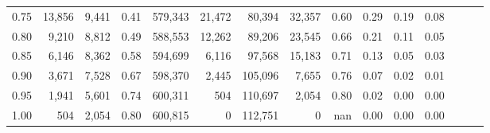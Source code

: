 \begin{tabular}{rrrrrrrrrrrrrrr}
0.75 &  13,856 &   9,441 &  0.41 &  579,343 &   21,472 &   80,394 &   32,357 &  0.60 &  0.29 &  0.19 &      0.08 \\
0.80 &   9,210 &   8,812 &  0.49 &  588,553 &   12,262 &   89,206 &   23,545 &  0.66 &  0.21 &  0.11 &      0.05 \\
0.85 &   6,146 &   8,362 &  0.58 &  594,699 &    6,116 &   97,568 &   15,183 &  0.71 &  0.13 &  0.05 &      0.03 \\
0.90 &   3,671 &   7,528 &  0.67 &  598,370 &    2,445 &  105,096 &    7,655 &  0.76 &  0.07 &  0.02 &      0.01 \\
0.95 &   1,941 &   5,601 &  0.74 &  600,311 &      504 &  110,697 &    2,054 &  0.80 &  0.02 &  0.00 &      0.00 \\
1.00 &     504 &   2,054 &  0.80 &  600,815 &        0 &  112,751 &        0 &   nan &  0.00 &  0.00 &      0.00 \\
\bottomrule
\end{tabular}
